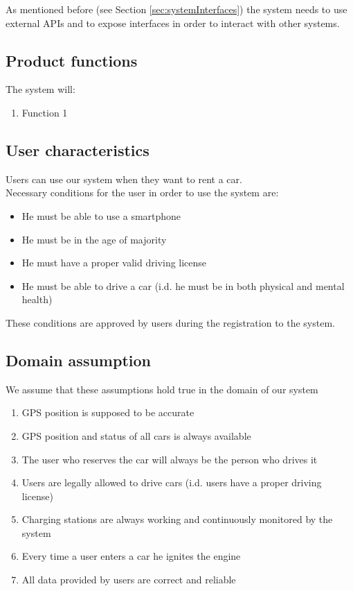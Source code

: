 	As mentioned before (see Section \ref{sec:systemInterfaces}) the system needs to use external APIs and to expose interfaces in order to interact with other systems.
	
\subsection{Product functions}
	The system will:
	\begin{enumerate}[label=\textbf{F\arabic*.}]
		\item Function 1
	\end{enumerate}

\subsection{User characteristics}
	Users can use our system when they want to rent a car.\\
	Necessary conditions for the user in order to use the system are:
	\begin{itemize}
		\item He must be able to use a smartphone
		\item He must be in the age of majority
		\item He must have a proper valid driving license
		\item He must be able to drive a car (i.d. he must be in both physical and mental health)
	\end{itemize}
	These conditions are approved by users during the registration to the system.

\subsection{Domain assumption}
	We assume that these assumptions hold true in the domain of our system 
	\begin{enumerate}[label=\textbf{DA\arabic*}]
		\item GPS position is supposed to be accurate
		\item GPS position and status of all cars is always available
		\item The user who reserves the car will always be the person who drives it
		\item Users are legally allowed to drive cars (i.d. users have a proper driving license)
		\item Charging stations are always working and continuously monitored by the system
		\item {}Every time a user enters a car he ignites the engine
		\item All data provided by users are correct and reliable
	\end{enumerate}